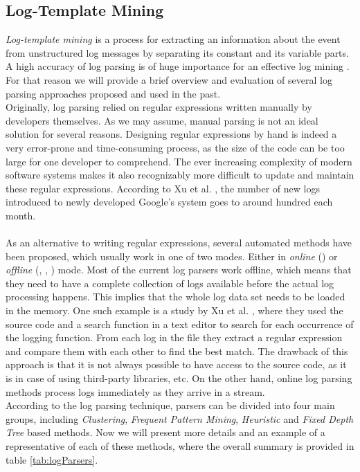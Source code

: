 \subsection{Log-Template Mining}\label{log_template_mining}

\textit{Log-template mining} is a process for extracting an information about the event from unstructured log messages by separating its constant and its variable parts. A high accuracy of log parsing is of huge importance for an effective log mining \cite{logParsingEvaluation2016}. For that reason we will provide a brief overview and evaluation of several log parsing approaches proposed and used in the past. \\
    
Originally, log parsing relied on regular expressions written manually by developers themselves. As we may assume, manual parsing is not an ideal solution for several reasons. Designing regular expressions by hand is indeed a very error-prone and time-consuming process, as the size of the code can be too large for one developer to comprehend. The ever increasing complexity of modern software systems makes it also recognizably more difficult to update and maintain these regular expressions. According to Xu et al. \cite{xu2009}, the number of new logs introduced to newly developed Google's system goes to around hundred each month. \\
\\
As an alternative to writing regular expressions, several automated methods have been proposed, which usually work in one of two modes. Either in \textit{online} (\cite{drain2017}) or \textit{offline} (\cite{vaarandi2003}, \cite{logsig2011}, \cite{Makanju2009ALA}) mode. Most of the current log parsers work offline, which means that they need to have a complete collection of logs available before the actual log processing happens. This implies that the whole log data set needs to be loaded in the memory. One such example is a study by Xu et al. \cite{xu2008}, where they used the source code and a search function in a text editor to search for each occurrence of the logging function. From each log in the file they extract a regular expression and compare them with each other to find the best match. The drawback of this approach is that it is not always possible to have access to the source code, as it is in case of using third-party libraries, etc. On the other hand, online log parsing methods process logs immediately as they arrive in a stream. \\
According to the log parsing technique, parsers can be divided into four main groups, including \textit{Clustering}, \textit{Frequent Pattern Mining}, \textit{Heuristic} and \textit{Fixed Depth Tree} based methods. Now we will present more details and an example of a representative of each of these methods, where the overall summary is provided in table \ref{tab:logParsers}.  \\


